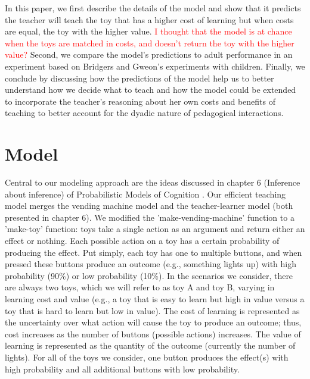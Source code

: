 \documentclass[10pt,letterpaper]{article}
\begin{document}
In this paper, we first describe the details of the model and show that it predicts the teacher will teach the toy that has a higher cost of learning but when costs are equal, the toy with the higher value. \textcolor{red}{I thought that the model is at chance when the toys are matched in costs, and doesn't return the toy with the higher value?} Second, we compare the model's predictions to adult performance in an experiment based on Bridgers and Gweon's experiments with children. Finally, we conclude by discussing how the predictions of the model help us to better understand how we decide what to teach and how the model could be extended to incorporate the teacher's reasoning about her own costs and benefits of teaching to better account for the dyadic nature of pedagogical interactions.

\section{Model}

Central to our modeling approach are the ideas discussed in chapter 6 (Inference about inference) of Probabilistic Models of Cognition \cite{Goodman}. Our efficient teaching model merges the vending machine model and the teacher-learner model (both presented in chapter 6).  We modified the 'make-vending-machine' function to a 'make-toy' function: toys take a single action as an argument and return either an effect or nothing. Each possible action on a toy has a certain probability of producing the effect. Put simply, each toy has one to multiple buttons, and when pressed these buttons produce an outcome (e.g., something lights up) with high probability (90\%) or low probability (10\%). In the scenarios we consider, there are always two toys, which we will refer to as toy A and toy B, varying in learning cost and value (e.g., a toy that is easy to learn but high in value versus a toy that is hard to learn but low in value). The cost of learning is represented as the uncertainty over what action will cause the toy to produce an outcome; thus, cost increases as the number of buttons (possible actions) increases. The value of learning is represented as the quantity of the outcome (currently the number of lights). For all of the toys we consider, one button produces the effect(s) with high probability and all additional buttons with low probability. 
\end{document}

